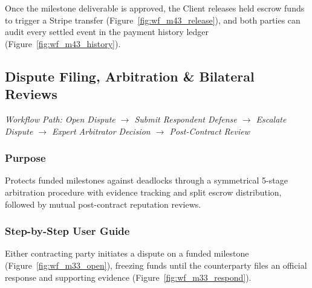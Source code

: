 

Once the milestone deliverable is approved, the Client releases held escrow funds to trigger a Stripe transfer (Figure~\ref{fig:wf_m43_release}), and both parties can audit every settled event in the payment history ledger (Figure~\ref{fig:wf_m43_history}).



\subsection{Dispute Filing, Arbitration \& Bilateral Reviews}
\noindent\textit{Workflow Path: Open Dispute $\rightarrow$ Submit Respondent Defense $\rightarrow$ Escalate Dispute $\rightarrow$ Expert Arbitrator Decision $\rightarrow$ Post-Contract Review}

\subsubsection{Purpose}
Protects funded milestones against deadlocks through a symmetrical 5-stage arbitration procedure with evidence tracking and split escrow distribution, followed by mutual post-contract reputation reviews.

\subsubsection{Step-by-Step User Guide}

Either contracting party initiates a dispute on a funded milestone (Figure~\ref{fig:wf_m33_open}), freezing funds until the counterparty files an official response and supporting evidence (Figure~\ref{fig:wf_m33_respond}).

